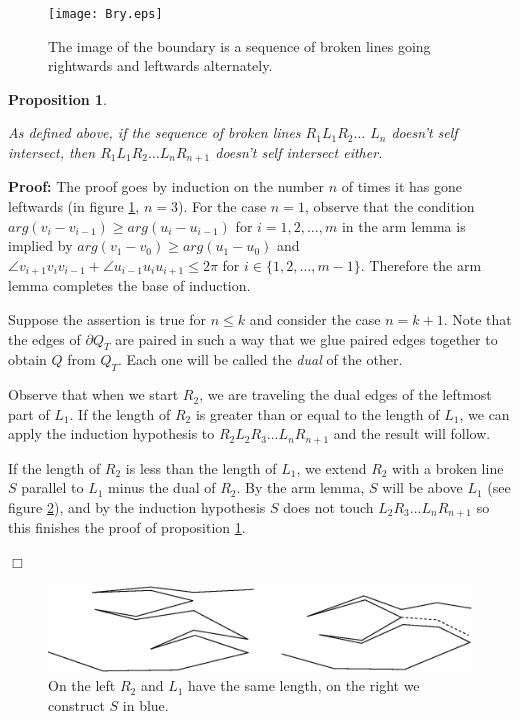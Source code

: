 \documentclass[openright, 12pt]{article}
\newtheorem{prop}[teorema]{Proposition}
\begin{document}
\begin{figure}[h]
\centering
{}
\texttt{[image: Bry.eps]}
\caption{The image of the boundary is a sequence of broken lines going rightwards and leftwards alternately.}\label{Cro}
\end{figure}




\begin{prop}\label{Zig}
{\rm As defined above, if the sequence of broken lines $R_1L_1R_2\ldots$ 
$ L_n$ doesn't self intersect, then $R_1L_1 R_2 \ldots L_nR_{n+1}$ doesn't self intersect either.  

}
\end{prop}




\textbf{Proof: }The proof goes by induction on the number $n$ of times it has gone leftwards (in figure \ref{Cro}, $n=3$). For the case $n=1$, observe that the condition $arg (v_{i} - v_{i-1} )\geq arg (u_{i} - u_{i-1})$ for $i =1, 2, \ldots, m$ in the arm lemma is implied by $arg (v_1 - v_0 )\geq arg (u_1 - u_0)$ and $\angle v_{i+1}v_iv_{i-1}+ \angle u_{i-1}u_iu_{i+1} \leq 2\pi$ for $i\in \{ 1,2, \ldots, m-1\}$. Therefore the arm lemma completes the base of induction.

Suppose the assertion is true for $n \leq k$ and consider the case $n=k+1$.  Note that the edges of $\partial Q_T$ are paired in such a way that we glue paired edges together to obtain $Q$ from $Q_T$. Each one will be called the \textit{dual} of the other.

Observe that when we start $R_2$, we are traveling the dual edges of the leftmost part of $L_1$. If the length of $R_2$ is greater than or equal to the length of $L_1$, we can apply the induction hypothesis to $R_2L_2R_3 \ldots L_nR_{n+1}$ and the result will follow. 

If the length of $R_2$ is less than the length of $L_1$, we extend $R_2 $ with a broken line $S$ parallel to $L_1$ minus the dual of $R_2$. By the arm lemma, $S$ will be above $L_1$ (see figure \ref{S}), and by the induction hypothesis $S$ does not touch $L_2R_3 \ldots L_nR_{n+1}$ so this finishes the proof of proposition \ref{Zig}.

\hfill $\Box$



\begin{figure}[h]
\centering
\includegraphics[scale=0.7]{S.eps}
\caption{On the left $R_2$ and $L_1$ have the same length, on the right we construct $S$ in blue.} \label{S}
\end{figure}
\end{document}
